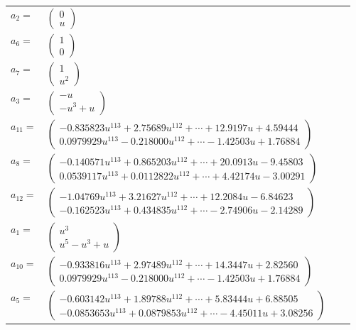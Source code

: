\documentclass[1p]{elsarticle_modified}
\theoremstyle{definition}
\begin{document}
\begin{tabular}{m{7pt} m{180pt} m{7pt} m{180pt} }
\flushright $a_{2}=$&$\begin{pmatrix}0\\u\end{pmatrix}$ \\
\flushright $a_{6}=$&$\begin{pmatrix}1\\0\end{pmatrix}$ \\
\flushright $a_{7}=$&$\begin{pmatrix}1\\u^2\end{pmatrix}$ \\
\flushright $a_{3}=$&$\begin{pmatrix}- u\\- u^3+u\end{pmatrix}$ \\
\flushright $a_{11}=$&$\begin{pmatrix}-0.835823 u^{113}+2.75689 u^{112}+\cdots+12.9197 u+4.59444\\0.0979929 u^{113}-0.218000 u^{112}+\cdots-1.42503 u+1.76884\end{pmatrix}$ \\
\flushright $a_{8}=$&$\begin{pmatrix}-0.140571 u^{113}+0.865203 u^{112}+\cdots+20.0913 u-9.45803\\0.0539117 u^{113}+0.0112822 u^{112}+\cdots+4.42174 u-3.00291\end{pmatrix}$ \\
\flushright $a_{12}=$&$\begin{pmatrix}-1.04769 u^{113}+3.21627 u^{112}+\cdots+12.2084 u-6.84623\\-0.162523 u^{113}+0.434835 u^{112}+\cdots-2.74906 u-2.14289\end{pmatrix}$ \\
\flushright $a_{1}=$&$\begin{pmatrix}u^3\\u^5- u^3+u\end{pmatrix}$ \\
\flushright $a_{10}=$&$\begin{pmatrix}-0.933816 u^{113}+2.97489 u^{112}+\cdots+14.3447 u+2.82560\\0.0979929 u^{113}-0.218000 u^{112}+\cdots-1.42503 u+1.76884\end{pmatrix}$ \\
\flushright $a_{5}=$&$\begin{pmatrix}-0.603142 u^{113}+1.89788 u^{112}+\cdots+5.83444 u+6.88505\\-0.0853653 u^{113}+0.0879853 u^{112}+\cdots-4.45011 u+3.08256\end{pmatrix}$ \\

\end{tabular}
\end{document}
